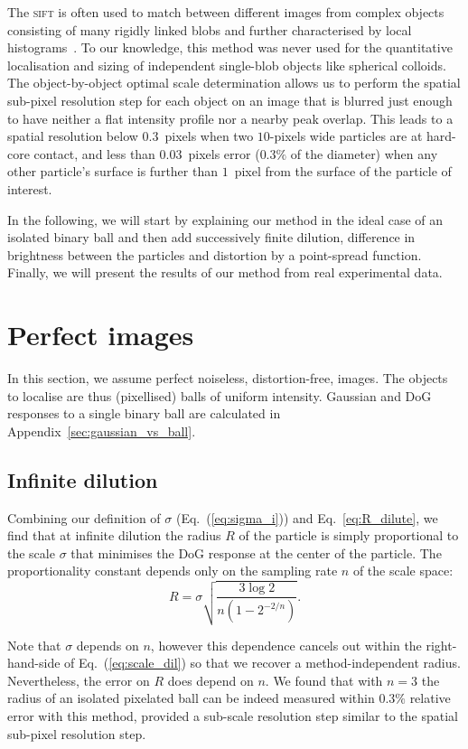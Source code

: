 The \textsc{sift} is often used to match between different images from complex objects consisting of many rigidly linked blobs and further characterised by local histograms~\citep{Lowe2004}. To our knowledge, this method was never used for the quantitative localisation and sizing of independent single-blob objects like spherical colloids. The object-by-object optimal scale determination allows us to perform the spatial sub-pixel resolution step for each object on an image that is blurred just enough to have neither a flat intensity profile nor a nearby peak overlap. This leads to a spatial resolution below $0.3$~pixels when two $10$-pixels wide particles are at hard-core contact, and less than $0.03$~pixels error ($0.3\%$ of the diameter) when any other particle's surface is further than $1$~pixel from the surface of the particle of interest.

In the following, we will start by explaining our method in the ideal case of an isolated binary ball and then add successively finite dilution, difference in brightness between the particles and distortion by a point-spread function. Finally, we will present the results of our method from real experimental data.

\section*{Perfect images}

In this section, we assume perfect noiseless, distortion-free, images. The objects to localise are thus (pixellised) balls of uniform intensity. Gaussian and DoG responses to a single binary ball are calculated in Appendix~\ref{sec:gaussian_vs_ball}. 

\subsection*{Infinite dilution}
Combining our definition of $\sigma$ (Eq.~(\ref{eq:sigma_i})) and Eq.~\ref{eq:R_dilute}, we find that at infinite dilution the radius $R$ of the particle is simply proportional to the scale $\sigma$ that minimises the DoG response at the center of the particle. The proportionality constant depends only on the sampling rate $n$ of the scale space:
\begin{equation}
	R = \sigma \sqrt{\frac{3 \log 2}{n(1-2^{-2/n})}}. 
	\label{eq:scale_dil}
\end{equation}

Note that $\sigma$ depends on $n$, however this dependence cancels out within the right-hand-side of Eq.~(\ref{eq:scale_dil}) so that we recover a method-independent radius. Nevertheless, the error on $R$ does depend on $n$. We found that with $n=3$ the radius of an isolated pixelated ball can be indeed measured within $0.3\%$ relative error with this method, provided a sub-scale resolution step similar to the spatial sub-pixel resolution step.

